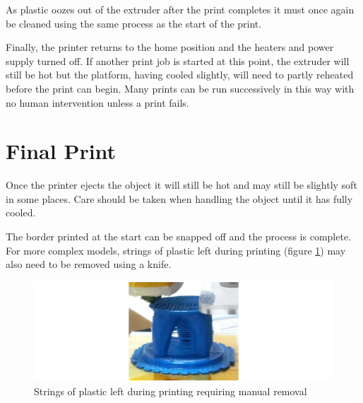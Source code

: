 			As plastic oozes out of the extruder after the print completes it must
			once again be cleaned using the same process as the start of the print.
			
			Finally, the printer returns to the home position and the heaters and
			power supply turned off. If another print job is started at this point,
			the extruder will still be hot but the platform, having cooled slightly,
			will need to partly reheated before the print can begin. Many prints can
			be run successively in this way with no human intervention unless a print
			fails.
		
	\section{Final Print}
		
		Once the printer ejects the object it will still be hot and may still be
		slightly soft in some places. Care should be taken when handling the object
		until it has fully cooled.
		
		The border printed at the start can be snapped off and the process is
		complete.  For more complex models, strings of plastic left during printing
		(figure \ref{fig:stringing}) may also need to be removed using a knife.
		
		\begin{figure}
			\includegraphics[width=1\textwidth]{diagrams/stringing.pdf}
			\caption{Strings of plastic left during printing requiring manual removal}
			\label{fig:stringing}
		\end{figure}
